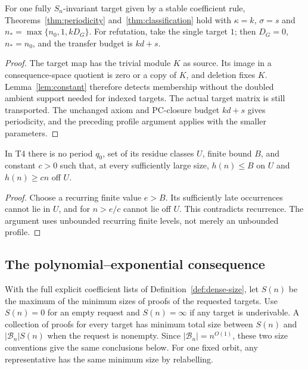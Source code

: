 \begin{corollary}\label{cor:invariant-budget}
For one fully $S_n$-invariant target given by a stable coefficient rule,
Theorems~\ref{thm:periodicity} and~\ref{thm:classification} hold with
$\kappa=k$, $\sigma=s$ and
$n_*=\max\{n_0,1,kD_G\}$. For refutation, take the single target $1$;
then $D_G=0$, $n_*=n_0$, and the transfer budget is $kd+s$.
\end{corollary}
\begin{proof}
The target map has the trivial module $K$ as source. Its image in a
consequence-space quotient is zero or a copy of $K$, and deletion fixes
$K$. Lemma~\ref{lem:constant} therefore detects membership without the
doubled ambient support needed for indexed targets. The actual target
matrix is still transported. The unchanged axiom and PC-closure budget
$kd+s$ gives periodicity, and the preceding profile argument applies
with the smaller parameters.
\end{proof}

\begin{proposition}\label{prop:no-periodic-split}
In T4 there is no period $q_0$, set of its residue classes $U$, finite
bound $B$, and constant $c>0$ such that, at every sufficiently large
size, $h(n)\le B$ on $U$ and $h(n)\ge cn$ off $U$.
\end{proposition}
\begin{proof}
Choose a recurring finite value $e>B$. Its sufficiently late occurrences
cannot lie in $U$, and for $n>e/c$ cannot lie off $U$. This contradicts
recurrence. The argument uses unbounded recurring finite levels, not
merely an unbounded profile.
\end{proof}

\subsection{The polynomial--exponential consequence}\label{sec:dense-types}
With the full explicit coefficient lists of
Definition~\ref{def:dense-size}, let $S(n)$ be the maximum of the minimum
sizes of proofs of the requested targets. Use $S(n)=0$ for an empty
request and $S(n)=\infty$ if any target is underivable. A collection of
proofs for every target has minimum total size between $S(n)$ and
$|\mathcal B_n|S(n)$ when the request is nonempty. Since
$|\mathcal B_n|=n^{O(1)}$, these two size conventions give the same
conclusions below. For one fixed orbit, any representative has the same
minimum size by relabelling.

